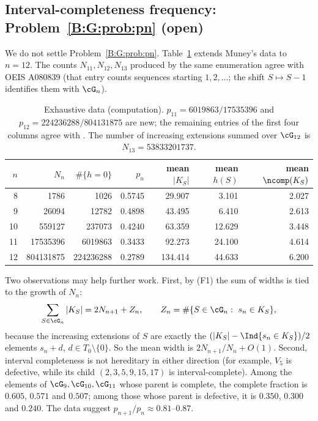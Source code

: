 \documentclass[11pt,a4paper]{article}
\theoremstyle{definition}
\theoremstyle{remark}
\numberwithin{equation}{section}
\begin{document}
\subsection{Interval-completeness frequency: Problem~\ref{B:G:prob:pn} (open)}\label{B:G:sub:pn}

We do not settle Problem~\ref{B:G:prob:pn}. Table~\ref{B:G:tab:pn} extends Muney's data to $n=12$.
The counts $N_{11},N_{12},N_{13}$ produced by the same enumeration agree with OEIS
A080839 \cite{R023} (that entry counts sequences starting $1,2,\dots$; the shift $S\mapsto S-1$
identifies them with $\cG_n$).

\begin{table}[ht]
\centering\small
\begin{tabular}{rrrrrrr}
\toprule
$n$ & $N_n$ & $\#\{h=0\}$ & $p_n$ & mean $|K_S|$ & mean $h(S)$ & mean $\ncomp(K_S)$\\
\midrule
 8 & 1786 & 1026 & 0.5745 & 29.907 & 3.101 & 2.027\\
 9 & 26094 & 12782 & 0.4898 & 43.495 & 6.410 & 2.613\\
10 & 559127 & 237073 & 0.4240 & 63.359 & 12.629 & 3.448\\
11 & 17535396 & 6019863 & 0.3433 & 92.273 & 24.100 & 4.614\\
12 & 804131875 & 224236288 & 0.2789 & 134.414 & 44.633 & 6.200\\
\bottomrule
\end{tabular}
\caption{Exhaustive data (computation). $p_{11}=6019863/17535396$ and
$p_{12}=224236288/804131875$ are new; the remaining entries of the first four columns agree with
\cite[Table~1 and Sect.~16]{R003}. The number of increasing extensions summed over $\cG_{12}$ is
$N_{13}=53833201737$.}
\label{B:G:tab:pn}
\end{table}

Two observations may help further work. First, by (F1) the sum of widths is tied to the growth of
$N_n$:
\[
 \sum_{S\in\cG_n}|K_S|=2N_{n+1}+Z_n,\qquad Z_n=\#\{S\in\cG_n:\ s_n\in K_S\},
\]
because the increasing extensions of $S$ are exactly the $(|K_S|-\Ind{s_n\in K_S})/2$ elements
$s_n+d$, $d\in T_0\setminus\{0\}$. So the mean width is $2N_{n+1}/N_n+O(1)$. Second, interval
completeness is not hereditary in either direction (for example, $V_5$ is defective, while its
child $(2,3,5,9,15,17)$ is interval-complete). Among the elements of $\cG_9,\cG_{10},\cG_{11}$
whose parent is complete, the complete fraction is $0.605$, $0.571$ and $0.507$; among those whose
parent is defective, it is $0.350$, $0.300$ and $0.240$. The data suggest
$p_{n+1}/p_n\approx0.81$--$0.87$.
\end{document}

